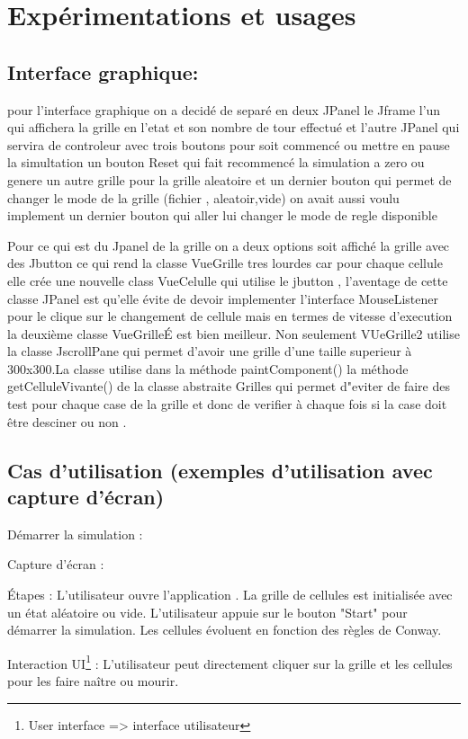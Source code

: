 \section{ Expérimentations et usages}
\subsection{Interface graphique:}


pour l'interface graphique on a decidé de separé en deux JPanel le Jframe l'un qui affichera la grille en l'etat et son nombre de tour effectué et l'autre JPanel qui servira de controleur avec trois boutons pour soit commencé ou mettre en pause la simultation un bouton Reset qui fait recommencé la simulation a zero ou genere un autre grille pour la grille aleatoire et un dernier bouton qui permet de changer le mode de la grille (fichier , aleatoir,vide) 
on avait aussi voulu implement un dernier bouton qui aller lui changer le mode de regle disponible

Pour ce qui est du Jpanel de la grille on a deux options soit affiché la grille avec des Jbutton ce qui rend la classe VueGrille tres lourdes car pour chaque cellule elle crée une nouvelle class VueCelulle qui utilise le jbutton , l'aventage de cette classe JPanel est qu'elle évite de devoir implementer l'interface MouseListener pour le clique sur le changement de cellule mais en termes de vitesse d'execution la deuxième classe VueGrilleÉ est bien meilleur.
Non seulement VUeGrille2 utilise la classe JscrollPane qui permet d'avoir une grille d'une taille superieur à 300x300.La classe utilise dans la méthode paintComponent() la méthode getCelluleVivante() de la classe abstraite Grilles qui permet d"eviter de faire des test pour chaque case de la grille et donc de verifier à chaque fois si la case doit être desciner ou non .  



\subsection{Cas d’utilisation (exemples d’utilisation avec capture d’écran)}
Démarrer la simulation :

Capture d'écran :

Étapes :
L'utilisateur ouvre l'application .
La grille de cellules est initialisée avec un état aléatoire ou vide.
L'utilisateur appuie sur le bouton "Start" pour démarrer la simulation.
Les cellules évoluent en fonction des règles de Conway.

Interaction UI\footnote{User interface => interface utilisateur}  :
L'utilisateur peut directement cliquer sur la grille et les cellules pour les faire naître ou mourir.

